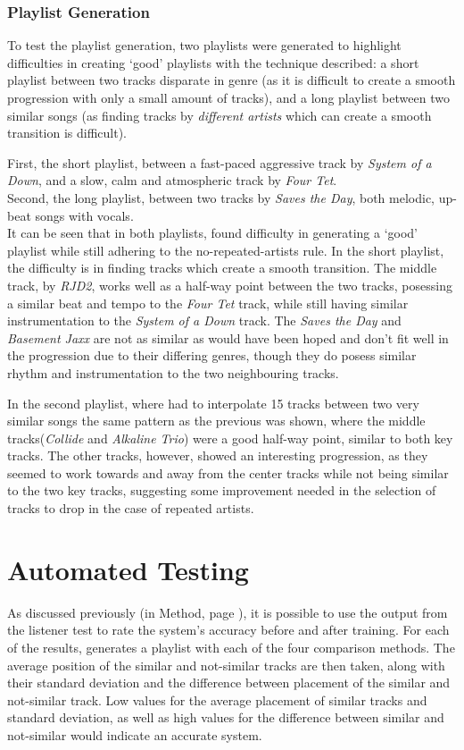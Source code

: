 \subsubsection{Playlist Generation}
To test the playlist generation, two playlists were generated to highlight difficulties in creating `good' playlists with the technique described: a short playlist between two tracks disparate in genre (as it is difficult to create a smooth progression with only a small amount of tracks), and a long playlist between two similar songs (as finding tracks by \emph{different artists} which can create a smooth transition is difficult).

First, the short playlist, between a fast-paced aggressive track by \emph{System of a Down}, and a slow, calm and atmospheric track by \emph{Four Tet}.\\

Second, the long playlist, between two tracks by \emph{Saves the Day}, both melodic, up-beat songs with vocals.\\

It can be seen that in both playlists,  found difficulty in generating a `good' playlist while still adhering to the no-repeated-artists rule. In the short playlist, the difficulty is in finding tracks which create a smooth transition. The middle track, by \emph{RJD2}, works well as a half-way point between the two tracks, posessing a similar beat and tempo to the \emph{Four Tet} track, while still having similar instrumentation to the \emph{System of a Down} track. The \emph{Saves the Day} and \emph{Basement Jaxx} are not as similar as would have been hoped and don't fit well in the progression due to their differing genres, though they do posess similar rhythm and instrumentation to the two neighbouring tracks.

In the second playlist, where  had to interpolate 15 tracks between two very similar songs the same pattern as the previous was shown, where the middle tracks(\emph{Collide} and \emph{Alkaline Trio}) were a good half-way point, similar to both key tracks. The other tracks, however, showed an interesting progression, as they seemed to work towards and away from the center tracks while not being similar to the two key tracks, suggesting some improvement needed in the selection of tracks to drop in the case of repeated artists.
\pagebreak
\section{Automated Testing}
As discussed previously (in Method, page \pageref{text:method:weight_optimisation}), it is possible to use the output from the listener test to rate the system's accuracy before and after training. For each of the results,  generates a playlist with each of the four comparison methods. The average position of the similar and not-similar tracks are then taken, along with their standard deviation and the difference between placement of the similar and not-similar track. Low values for the average placement of similar tracks and standard deviation, as well as high values for the difference between similar and not-similar would indicate an accurate system.

